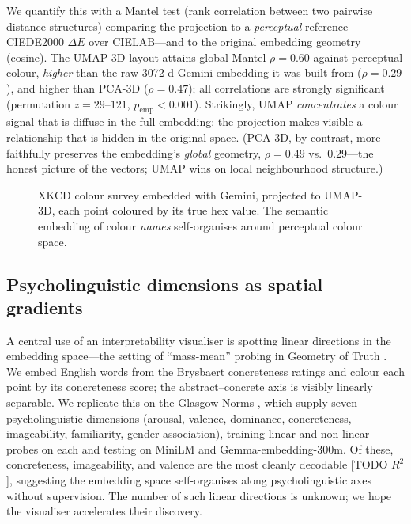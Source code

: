 \documentclass[11pt]{article}
\begin{document}
We quantify this with a Mantel test (rank correlation between two pairwise
distance structures) comparing the projection to a \emph{perceptual}
reference---CIEDE2000 $\Delta E$ over CIELAB---and to the original
embedding geometry (cosine). The UMAP-3D layout attains global Mantel
$\rho = 0.60$ against perceptual colour, \emph{higher} than the raw
3072-d Gemini embedding it was built from ($\rho = 0.29$), and higher than
PCA-3D ($\rho = 0.47$); all correlations are strongly significant
(permutation $z = 29$--$121$, $p_{\text{emp}} < 0.001$). Strikingly, UMAP
\emph{concentrates} a colour signal that is diffuse in the full embedding:
the projection makes visible a relationship that is hidden in the original
space. (PCA-3D, by contrast, more faithfully preserves the embedding's
\emph{global} geometry, $\rho = 0.49$ vs.\ $0.29$---the honest picture of
the vectors; UMAP wins on local neighbourhood structure.)

\begin{figure}[t]
  \centering
  \caption{XKCD colour survey embedded with Gemini, projected to UMAP-3D,
  each point coloured by its true hex value. The semantic embedding of
  colour \emph{names} self-organises around perceptual colour space.}
  \label{fig:xkcd}
\end{figure}

\subsection{Psycholinguistic dimensions as spatial gradients}
\label{sec:concreteness}
A central use of an interpretability visualiser is spotting linear
directions in the embedding space---the setting of ``mass-mean'' probing in
Geometry of Truth \citep{marks2023geometry}. We embed English words from
the Brysbaert concreteness ratings \citep{brysbaert2014concreteness} and
colour each point by its concreteness score; the abstract--concrete axis is
visibly linearly separable. We replicate this on the Glasgow Norms
\citep{scott2019glasgow}, which supply seven psycholinguistic dimensions
(arousal, valence, dominance, concreteness, imageability, familiarity,
gender association), training linear and non-linear probes on each and
testing on MiniLM and Gemma-embedding-300m.
Of these, concreteness, imageability, and valence are the most cleanly
decodable [TODO $R^2$], suggesting the embedding space self-organises along
psycholinguistic axes without supervision. The number of such linear
directions is unknown; we hope the visualiser accelerates their discovery.
\end{document}
